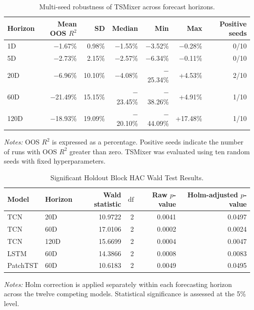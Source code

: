 \documentclass[12pt,twoside]{ord}
\begin{document}
\begin{table}[htbp]
\centering
\caption{Multi-seed robustness of TSMixer across forecast horizons.}\label{tab:tsmixer_multiseed}
\setlength{\tabcolsep}{4.5pt}
\begin{tabular}{lrrrrrr}
\hline
Horizon & Mean OOS $R^2$ & SD & Median & Min & Max & Positive seeds \\
\hline
1D   & $-$1.67\%  & 0.98\%  & $-$1.55\%  & $-$3.52\%  & $-$0.28\% & 0/10 \\
5D   & $-$2.73\%  & 2.15\%  & $-$2.57\%  & $-$6.34\%  & $-$0.11\% & 0/10 \\
20D  & $-$6.96\%  & 10.10\% & $-$4.08\%  & $-$25.34\% & +4.53\%   & 2/10 \\
60D  & $-$21.49\% & 15.15\% & $-$23.45\% & $-$38.26\% & +4.91\%   & 1/10 \\
120D & $-$18.93\% & 19.09\% & $-$20.10\% & $-$44.09\% & +17.48\%  & 1/10 \\
\hline
\end{tabular}
\par\vspace{4pt}\parbox{\linewidth}{\fontsize{9pt}{12pt}\selectfont\textit{Notes:} OOS $R^2$ is expressed as a percentage. Positive seeds indicate the number of runs with OOS $R^2$ greater than zero. TSMixer was evaluated using ten random seeds with fixed hyperparameters.}
\end{table}

\begin{table}[htbp]
\centering
\caption{Significant Holdout Block HAC Wald Test Results.}\label{tab:h3_holdout_sig}
\setlength{\tabcolsep}{4.5pt}
\begin{tabular}{llrrrr}
\hline
Model & Horizon & Wald statistic & $\mathrm{df}$ & Raw $p$-value & Holm-adjusted $p$-value \\
\hline
TCN & 20D & 10.9722 & 2 & 0.0041 & 0.0497 \\
TCN & 60D & 17.0106 & 2 & 0.0002 & 0.0024 \\
TCN & 120D & 15.6699 & 2 & 0.0004 & 0.0047 \\
LSTM & 60D & 14.3866 & 2 & 0.0008 & 0.0083 \\
PatchTST & 60D & 10.6183 & 2 & 0.0049 & 0.0495 \\
\hline
\end{tabular}
\par\vspace{4pt}\parbox{\linewidth}{\fontsize{9pt}{12pt}\selectfont\textit{Notes:} Holm correction is applied separately within each forecasting horizon across the twelve competing models. Statistical significance is assessed at the 5\% level.}
\end{table}
\end{document}
